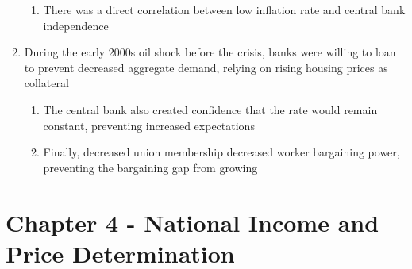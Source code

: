 \documentclass[11 pt, twoside]{article}
\begin{document}
\begin{enumerate}
\begin{enumerate}
\item There was a direct correlation between low inflation rate and central bank independence
\end{enumerate}
\item During the early 2000s oil shock before the crisis, banks were willing to loan to prevent decreased aggregate demand, relying on rising housing prices as collateral
\begin{enumerate}
\item The central bank also created confidence that the rate would remain constant, preventing increased expectations
\item Finally, decreased union membership decreased worker bargaining power, preventing the bargaining gap from growing
\end{enumerate}
\end{enumerate}



\section{Chapter 4 - National Income and Price Determination}
\end{document}
